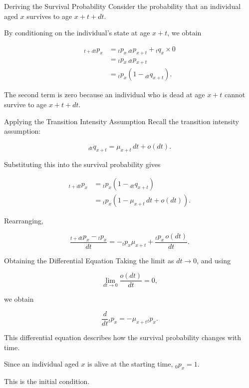 \documentclass[
  ignorenonframetext,
  aspectratio=169,
]{beamer}
\begin{document}
\begin{frame}{Deriving the Survival Probability}
\protect{}\label{deriving-the-survival-probability-1}
Consider the probability that an individual aged \(x\) survives to age
\(x+t+dt\).

By conditioning on the individual's state at age \(x+t\), we obtain

\[
\begin{aligned}
{}_{t+dt}p_x
&={}_tp_x\,{}_{dt}p_{x+t}
  +{}_tq_x\times 0\\
&={}_tp_x\,{}_{dt}p_{x+t}\\
&={}_tp_x\left(1-{}_{dt}q_{x+t}\right).
\end{aligned}
\]

The second term is zero because an individual who is dead at age \(x+t\)
cannot survive to age \(x+t+dt\).
\end{frame}

\begin{frame}{Applying the Transition Intensity Assumption}
\protect{}\label{applying-the-transition-intensity-assumption}
Recall the transition intensity assumption:

\[
{}_{dt}q_{x+t}
=\mu_{x+t}\,dt+o(dt).
\]

Substituting this into the survival probability gives

\[
\begin{aligned}
{}_{t+dt}p_x
&={}_tp_x\left(1-{}_{dt}q_{x+t}\right)\\
&={}_tp_x\left(1-\mu_{x+t}\,dt+o(dt)\right).
\end{aligned}
\]

Rearranging,

\[
\frac{{}_{t+dt}p_x-{}_tp_x}{dt}
=
-{}_tp_x\mu_{x+t}
+\frac{{}_tp_x\,o(dt)}{dt}.
\]
\end{frame}

\begin{frame}{Obtaining the Differential Equation}
\protect{}\label{obtaining-the-differential-equation}
Taking the limit as \(dt\to 0\), and using

\[
\lim_{dt\to 0}\frac{o(dt)}{dt}=0,
\]

we obtain

\[
\boxed{
\frac{d}{dt}{}_tp_x
=-\mu_{x+t}{}_tp_x.
}
\]

This differential equation describes how the survival probability
changes with time.

Since an individual aged \(x\) is alive at the starting time,
\(\boxed{{}_0p_x=1.}\)

This is the initial condition.
\end{frame}
\end{document}
